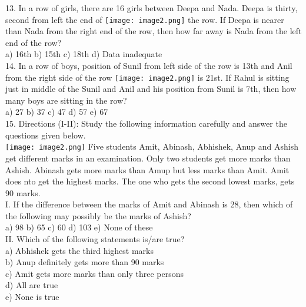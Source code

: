 \documentclass[
]{article}
\begin{document}
13. In a row of girls, there are 16 girls between Deepa and Nada. Deepa is thirty, second from left the end of \texttt{[image: image2.png]}
the row. If Deepa is nearer than Nada from the right end of the row, then how far away is Nada from the left end of the row?\\
a) 16th \hspace{2mm}b) 15th \hspace{2mm}c) 18th \hspace{2mm}d) Data inadequate\\

14. In a row of boys, position of Sunil from left side of the row is 13th and Anil from the right side of the row \texttt{[image: image2.png]}
is 21st. If Rahul is sitting just in middle of the Sunil and Anil and his position from Sunil is 7th, then how many boys are sitting in the row?\\
a) 27 \hspace{2mm}b) 37 \hspace{2mm}c) 47 \hspace{2mm}d) 57 \hspace{2mm}e) 67\\

15. Directions (I-II): Study the following information carefully and answer the questions given
below.\\
\texttt{[image: image2.png]}
Five students Amit, Abinash, Abhishek, Anup and Ashish get different marks in an examination. Only two students get more marks than Ashish. Abinash gets more marks than Amup but less marks than Amit. Amit does nto get the highest marks. The one who gets the second lowest marks, gets 90 marks.\\

I. If the difference between the marks of Amit and Abinash is 28, then which of the following may possibly be the marks of Ashish?\\
a) 98 \hspace{2mm}b) 65 \hspace{2mm}c) 60 \hspace{2mm}d) 103 \hspace{2mm}e) None of these\\

II. Which of the following statements is/are true?\\
a) Abhishek gets the third highest marks\\
b) Anup definitely gets more than 90 marks\\
c) Amit gets more marks than only three persons\\
d) All are true\\
e) None is true\\
\end{document}
